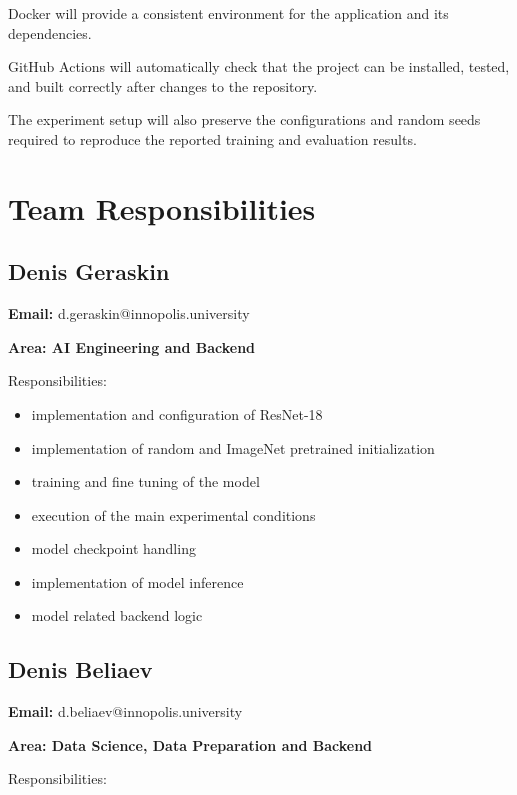 \documentclass[11pt,a4paper]{article}
\begin{document}
Docker will provide a consistent environment for the application and its dependencies.

GitHub Actions will automatically check that the project can be installed, tested,
and built correctly after changes to the repository.

The experiment setup will also preserve the configurations and random seeds required
to reproduce the reported training and evaluation results.


\section{Team Responsibilities}

\subsection{Denis Geraskin}

\textbf{Email:} d.geraskin@innopolis.university

\textbf{Area: AI Engineering and Backend}

Responsibilities:

\begin{itemize}
    \item implementation and configuration of ResNet-18
    \item implementation of random and ImageNet pretrained initialization
    \item training and fine tuning of the model
    \item execution of the main experimental conditions
    \item model checkpoint handling
    \item implementation of model inference
    \item model related backend logic
\end{itemize}

\subsection{Denis Beliaev}

\textbf{Email:} d.beliaev@innopolis.university

\textbf{Area: Data Science, Data Preparation and Backend}

Responsibilities:
\end{document}
